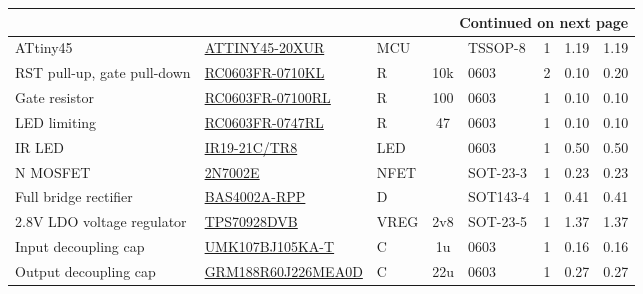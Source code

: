 \documentclass[openbib,letterpaper,10pt]{article}
\begin{document}
\begin{spacing}{1.15}
\begin{appendix}
\begin{singlespacing}
\begin{center}
\begin{longtable}{|l|l|l|c|l|c|r|r|}
		\hline \multicolumn{8}{|r|}{{Continued on next page}} \\ \hline
		\endfoot
		\endlastfoot
			ATtiny45 & \href{http://www.digikey.com/product-detail/en/microchip-technology/ATTINY45-20XUR/ATTINY45-20XURCT-ND/2774364}{ATTINY45-20XUR} & MCU & & TSSOP-8 & 1 & 1.19 & 1.19 \\ \hline

			RST pull-up, gate pull-down & \href{http://www.digikey.com/product-detail/en/yageo/RC0603FR-0710KL/311-10.0KHRCT-ND/729827}{RC0603FR-0710KL} & R & 10k & 0603 & 2 & 0.10 & 0.20 \\ \hline

			Gate resistor & \href{http://www.digikey.com/product-detail/en/yageo/RC0603FR-07100RL/311-100HRCT-ND/729835}{RC0603FR-07100RL} & R & 100 & 0603 & 1 & 0.10 & 0.10 \\ \hline

			LED limiting & \href{http://www.digikey.com/product-detail/en/yageo/RC0603FR-0747RL/311-47.0HRCT-ND/730199}{RC0603FR-0747RL} & R & 47 & 0603 & 1 & 0.10 & 0.10 \\ \hline

			IR LED & \href{http://www.digikey.com/product-detail/en/everlight-electronics-co-ltd/IR19-21C-TR8/1080-1354-1-ND/2676088}{IR19-21C/TR8} & LED & & 0603 & 1 & 0.50 & 0.50 \\ \hline

			N MOSFET & \href{http://www.digikey.com/product-detail/en/panasonic-electronic-components/2N7002E/2N7002ECT-ND/4357001}{2N7002E} & NFET & & SOT-23-3 & 1 & 0.23 & 0.23 \\ \hline

			Full bridge rectifier & \href{http://www.digikey.com/product-detail/en/infineon-technologies/BAS-4002A-RPP-E6327/BAS4002ARPPE6327INCT-ND/2023145}{BAS4002A-RPP} & D & & SOT143-4 & 1 & 0.41 & 0.41 \\ \hline

			2.8V LDO voltage regulator & \href{http://www.digikey.com/product-detail/en/texas-instruments/TPS70928DBVT/296-39473-1-ND/5143421}{TPS70928DVB} & VREG & 2v8 & SOT-23-5 & 1 & 1.37 & 1.37 \\ \hline

			Input decoupling cap & \href{http://www.digikey.com/product-detail/en/taiyo-yuden/UMK107BJ105KA-T/587-2400-1-ND/2179013}{UMK107BJ105KA-T} & C & 1u & 0603 & 1 & 0.16 & 0.16 \\ \hline

			Output decoupling cap & \href{http://www.digikey.com/product-detail/en/murata-electronics-north-america/GRM188R60J226MEA0D/490-7611-1-ND/4280544}{GRM188R60J226MEA0D} & C & 22u & 0603 & 1 & 0.27 & 0.27 \\ \hline


\end{longtable}
\end{center}
\end{singlespacing}
\end{appendix}
\end{spacing}
\end{document}
